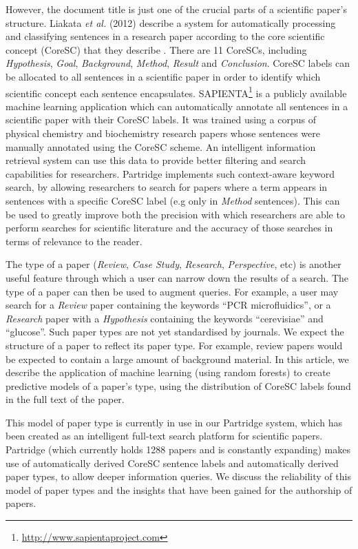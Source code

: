 \documentclass{svmult}
\begin{document}
However, the document title is just one of the crucial parts of a scientific
paper's structure.  Liakata \emph{et al.} (2012) describe a system for
automatically processing and classifying sentences in a research paper
according to the core scientific concept (CoreSC) that they describe
\cite{Liakata2012}.  There are 11 CoreSCs, including {\em Hypothesis}, {\em
Goal}, {\it Background}, {\em Method}, {\em Result} and {\em Conclusion}.
CoreSC labels can be allocated to all sentences in a scientific paper in order
to identify which scientific concept each sentence encapsulates.
SAPIENTA\footnote{\url{http://www.sapientaproject.com}} is a publicly available
machine learning application which can automatically annotate all sentences in
a scientific paper with their CoreSC labels. It was trained using a corpus of
physical chemistry and biochemistry research papers whose sentences were
manually annotated using the CoreSC \cite{LIAKATA10.644} scheme.  An
intelligent information retrieval system can use this data to provide better
filtering and search capabilities for researchers.  Partridge implements such
context-aware keyword search, by allowing researchers to search for papers
where a term appears in sentences with a specific CoreSC label (e.g only in
{\em Method} sentences). This can be used to greatly improve both the precision
with which researchers are able to perform searches for scientific literature
and the accuracy of those searches in terms of relevance to the reader.

The type of a paper ({\em Review}, {\em Case Study}, {\em Research}, {\em
Perspective}, etc) is another useful feature through which a user can narrow
down the results of a search.  The type of a paper can then be used to augment
queries.  For example, a user may search for a {\em Review} paper containing
the keywords ``PCR microfluidics'', or a {\em Research} paper with a {\em
Hypothesis} containing the keywords ``cerevisiae'' and ``glucose''.   Such
paper types are not yet standardised by journals.  We expect the structure of a
paper to reflect its paper type.  For example, review papers would be expected
to contain a large amount of background material.  In this article, we describe
the application of machine learning (using random forests) to create predictive
models of a paper's type, using the distribution of CoreSC labels found in the
full text of the paper. 

This model of paper type is currently in use in our Partridge system, which has
been created as an intelligent full-text search platform for scientific papers.
Partridge (which currently holds 1288 papers and is constantly expanding) 
makes use of automatically derived CoreSC sentence labels and
automatically derived paper types, to allow deeper information queries.  We
discuss the reliability of this model of paper types and the insights that have
been gained for the authorship of papers.
\end{document}
